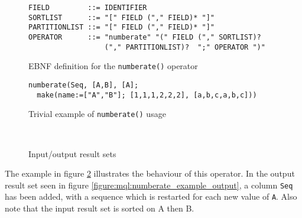 \begin{figure}[!h]
\begin{center}
\begin{Verbatim}
FIELD         ::= IDENTIFIER
SORTLIST      ::= "[" FIELD ("," FIELD)* "]"
PARTITIONLIST ::= "[" FIELD ("," FIELD)* "]"
OPERATOR      ::= "numberate" "(" FIELD ("," SORTLIST)? 
                  ("," PARTITIONLIST)?  ";" OPERATOR ")"
\end{Verbatim}
  \caption{EBNF definition for the \texttt{numberate()} operator}
  \label{figure:mql:numberate_ebnf}
\end{center}
\end{figure}

\begin{figure}[!h]
\begin{center}
\begin{Verbatim}
numberate(Seq, [A,B], [A];
  make(name:=["A","B"]; [1,1,1,2,2,2], [a,b,c,a,b,c]))
\end{Verbatim}
  \caption{Trivial example of \texttt{numberate()} usage}
  \label{figure:mql:numberate_example}
\end{center}
\end{figure}

\begin{figure}[!h]
\centering
\mbox{
\quad
{}
}
\caption{Input/output result sets}
\end{figure}
The example in figure \ref{figure:mql:numberate_example} illustrates the
behaviour of this operator. In the output result set seen in figure
\ref{figure:mql:numberate_example_output}, a column \texttt{Seq} has been
added, with a sequence which is restarted for each new value of \texttt{A}.
Also note that the input result set is sorted on A then B.

